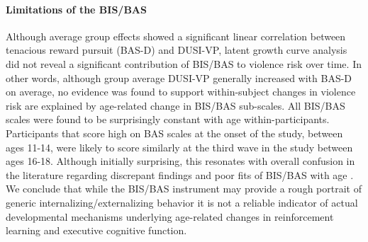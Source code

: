 \documentclass[utf8]{article}
\begin{document}
\paragraph{Limitations of the BIS/BAS} Although average group effects showed a significant linear correlation between tenacious reward pursuit (BAS-D) and DUSI-VP, latent growth curve analysis did not reveal a significant contribution of BIS/BAS to violence risk over time. In other words, although group average DUSI-VP generally increased with BAS-D on average, no evidence was found to support within-subject changes in violence risk are explained by age-related change in BIS/BAS sub-scales. All BIS/BAS scales were found to be surprisingly constant with age within-participants. Participants that score high on BAS scales at the onset of the study, between ages 11-14, were likely to score similarly at the third wave in the study between ages 16-18. Although initially surprising, this resonates with overall confusion in the literature regarding discrepant findings and poor fits of BIS/BAS with age \citep{pagliaccio2016revising}. We conclude that while the BIS/BAS instrument may provide a rough portrait of generic internalizing/externalizing behavior it is not a reliable indicator of actual developmental mechanisms underlying age-related changes in reinforcement learning and executive cognitive function. 
\end{document}
